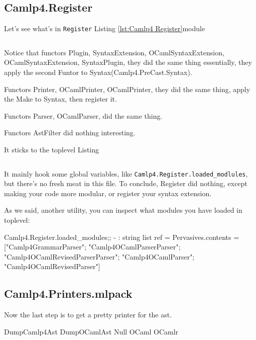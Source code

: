 \subsection{Camlp4.Register}
Let's see what's in \verb|Register| Listing \ref{lst:Camlp4
  Register}module


\inputminted[fontsize=\scriptsize,
]{ocaml}{code/camlp4/source/Register.ml}

Notice that functors Plugin, SyntaxExtension, OCamlSyntaxExtension,
OCamlSyntaxExtension, SyntaxPlugin, they did the same thing
essentially, they apply the second Funtor to
Syntax(Camlp4.PreCast.Syntax).

Functors Printer, OCamlPrinter, OCamlPrinter, they did the same thing,
apply the Make to Syntax, then register it. 

Functors Parser, OCamlParser, did the same thing. 

Functors AstFilter  did nothing interesting.

It sticks to the toplevel Listing

\inputminted[fontsize=\scriptsize, firstline=123, lastline=126,
]{ocaml}{code/camp4/source/Register.ml}

It mainly hook some global variables, like
\verb|Camlp4.Register.loaded_modlules|, but there's no fresh meat in
this file.  To conclude, Register did nothing, except making your code
more modular, or register your syntax extension.

As we said, another utility, you can inspect what modules you have
loaded in toplevel:

\begin{ocamlcode}
Camlp4.Register.loaded_modules;;
- : string list ref =
{Pervasives.contents =
  ["Camlp4GrammarParser"; "Camlp4OCamlParserParser";
   "Camlp4OCamlRevisedParserParser"; "Camlp4OCamlParser";
   "Camlp4OCamlRevisedParser"]}
\end{ocamlcode}

\subsection{Camlp4.Printers.mlpack}
\label{Camlp4.Printers}

Now the last step is to get a pretty printer for the ast.

\begin{bashcode}
DumpCamlp4Ast
DumpOCamlAst
Null
OCaml
OCamlr
\end{bashcode}

